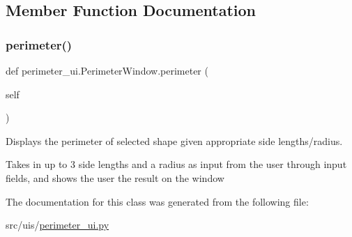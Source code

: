 \subsection{Member Function Documentation}
\mbox{\label{classperimeter__ui_1_1_perimeter_window_afdeb1c9d24171741ae3077eaa4e2070d}} 
\subsubsection{\texorpdfstring{perimeter()}{perimeter()}}
{\footnotesize\ttfamily def perimeter\+\_\+ui.\+Perimeter\+Window.\+perimeter (\begin{DoxyParamCaption}\item[{}]{self }\end{DoxyParamCaption})}



Displays the perimeter of selected shape given appropriate side lengths/radius. 

Takes in up to 3 side lengths and a radius as input from the user through input fields, and shows the user the result on the window 

The documentation for this class was generated from the following file\+:\begin{DoxyCompactItemize}
\item 
src/uis/\hyperlink{perimeter__ui_8py}{perimeter\+\_\+ui.\+py}\end{DoxyCompactItemize}
